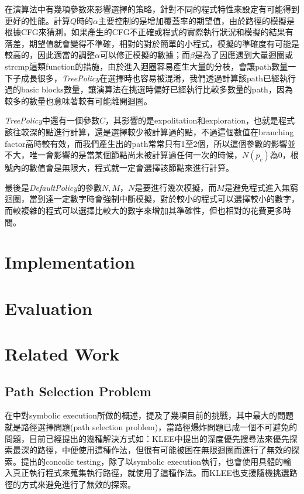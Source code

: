 \documentclass[12pt,a4paper,oneside]{book}
\begin{document}
在演算法中有幾項參數來影響選擇的策略，針對不同的程式特性來設定有可能得到更好的性能。計算$Q$時的$\alpha$主要控制的是增加覆蓋率的期望值，由於路徑的模擬是根據CFG來猜測，如果產生的CFG不正確或程式的實際執行狀況和模擬的結果有落差，期望值就會變得不準確，相對的對於簡單的小程式，模擬的準確度有可能是較高的，因此適當的調整$\alpha$可以修正模擬的數據；而$\beta$是為了因應遇到大量迴圈或strcmp這類function的措施，由於進入迴圈容易產生大量的分枝，會讓path數量一下子成長很多，\textit{TreePolicy}在選擇時也容易被混淆，我們透過計算該path已經執行過的basic blocks數量，讓演算法在挑選時偏好已經執行比較多數量的path，因為較多的數量也意味著較有可能離開迴圈。

\textit{TreePolicy}中還有一個參數$C$，其影響的是expolitation和exploration，也就是程式該往較深的點進行計算，還是選擇較少被計算過的點，不過這個數值在branching factor高時較有效，而我們產生出的path常常只有1至2個，所以這個參數的影響並不大，唯一會影響的是當某個節點尚未被計算過任何一次的時候，$N(p_c)$為0，根號內的數值會是無限大，程式就一定會選擇該節點來進行計算。
  
最後是\textit{DefaultPolicy}的參數$N,M$，$N$是要進行幾次模擬，而$M$是避免程式進入無窮迴圈，當到達一定數字時會強制中斷模擬，對於較小的程式可以選擇較小的數字，而較複雜的程式可以選擇比較大的數字來增加其準確性，但也相對的花費更多時間。
  
\chapter{Implementation}

\chapter{Evaluation}

\chapter{Related Work}

\section{Path Selection Problem}

在\cite{sharma2012critical}\cite{schwartz2010all}中對symbolic execution所做的概述，提及了幾項目前的挑戰，其中最大的問題就是路徑選擇問題(path selection problem)，當路徑爆炸問題已成一個不可避免的問題，目前已經提出的幾種解決方式如：KLEE\cite{cadar2008klee}中提出的深度優先搜尋法來優先探索最深的路徑，中便使用這種作法，但很有可能被困在無限迴圈而進行了無效的探索。\cite{sen2007concolic}提出的concolic testing，除了以symbolic execution執行，也會使用具體的輸入真正執行程式來蒐集執行路徑，\cite{sen2005cute}就使用了這種作法。而KLEE\cite{cadar2008klee}也支援隨機挑選路徑的方式來避免進行了無效的探索。
\end{document}
